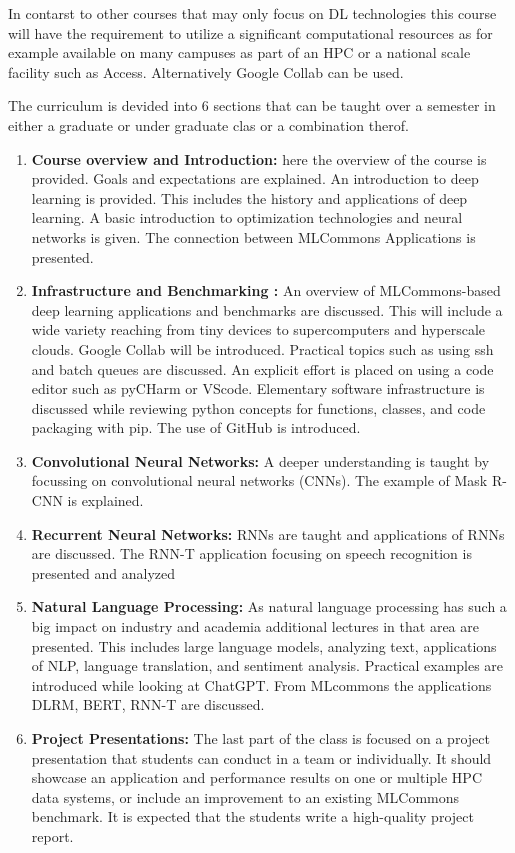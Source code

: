 \documentclass[utf8]{FrontiersinVancouver} %
\begin{document}
In contarst to other courses that may only focus on DL technologies
this course will have the requirement to utilize a significant
computational resources as for example available on many campuses as
part of an HPC or a national scale facility such as
Access. Alternatively Google Collab can be used.

The curriculum is devided into 6 sections that can be taught over a
semester in either a graduate or under graduate clas or a combination
therof.

\begin{enumerate}
  
\item{\bf Course overview and Introduction:} here the overview of the
  course is provided. Goals and expectations are explained. An
  introduction to deep learning is provided. This includes the history and
  applications of deep learning. A basic introduction to optimization
  technologies and neural networks is given. The connection between
  MLCommons Applications is presented.

\item{\bf Infrastructure and Benchmarking :} An overview of
  MLCommons-based deep learning applications and benchmarks are
  discussed. This will include a wide variety reaching from tiny
  devices to supercomputers and hyperscale clouds. Google Collab will
  be introduced. Practical topics such as using ssh and batch queues
  are discussed. An explicit effort is placed on using a code editor
  such as pyCHarm or VScode. Elementary software infrastructure is
  discussed while reviewing python concepts for functions, classes,
  and code packaging with pip. The use of GitHub is introduced.
  
\item{\bf Convolutional Neural Networks:} A deeper understanding is taught
  by focussing on convolutional neural networks (CNNs). The example of
  Mask R-CNN is explained.

\item{\bf Recurrent Neural Networks:} RNNs are taught and applications of
  RNNs are discussed. The RNN-T application focusing on speech
  recognition is presented and analyzed

\item{\bf Natural Language Processing:} As natural language processing has
  such a big impact on industry and academia additional lectures in that area
   are presented. This includes large language models,
  analyzing text, applications of NLP, language translation, and sentiment
  analysis.  Practical examples are introduced while looking at
  ChatGPT. From MLcommons the applications DLRM, BERT, RNN-T are
  discussed.

\item{\bf Project Presentations:} The last part of the class is
  focused on a project presentation that students can conduct in a
  team or individually. It should showcase an application and
  performance results on one or multiple HPC data systems, or include
  an improvement to an existing MLCommons benchmark. It is expected
  that the students write a high-quality project report.
  
 \end{enumerate}
\end{document}
